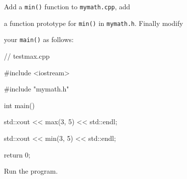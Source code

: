 Add a \texttt{min()} function to \texttt{mymath.cpp}, add

a function prototype for \texttt{min()} in \texttt{mymath.h}. Finally modify

your \texttt{main()} as follows:

\begin{consolethree}[escapeinside=||]

// testmax.cpp



#include <iostream>

#include "mymath.h"



int main()

{

    std::cout << max(3, 5) << std::endl;

    std::cout << min(3, 5) << std::endl;

    return 0;

}

\end{consolethree}

Run the program.


